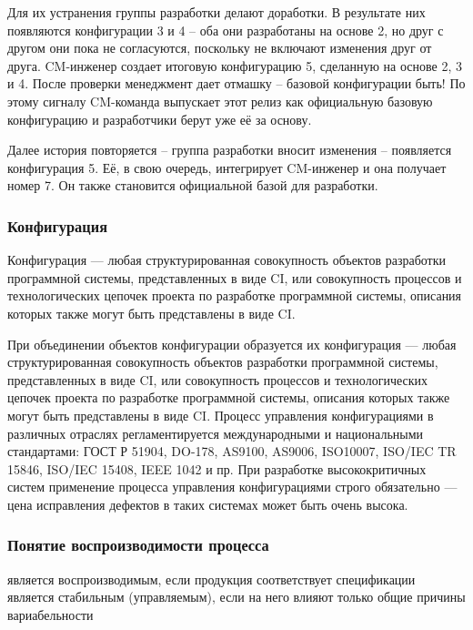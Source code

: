\documentclass{../industrial-development}
\begin{document}
Для их устранения группы разработки делают доработки. В результате них появляются конфигурации 3 и 4 – оба они разработаны на основе 2, но друг с другом они пока не согласуются, поскольку не включают изменения друг от друга. CM-инженер создает итоговую конфигурацию 5, сделанную на основе 2, 3 и 4. После проверки менеджмент дает отмашку – базовой конфигурации быть! По этому сигналу CM-команда выпускает этот релиз как официальную базовую конфигурацию и разработчики берут уже её за основу.

Далее история повторяется – группа разработки вносит изменения – появляется конфигурация 5. Её, в свою очередь, интегрирует CM-инженер и она получает номер 7. Он также становится официальной базой для разработки.
~\cite{Configurations}

\begin{frame} \frametitle{Конфигурация}
   \begin{block}{Конфигурация — любая структурированная совокупность объектов разработки программной системы, представленных в виде CI, или совокупность процессов и технологических цепочек проекта по разработке программной системы, описания которых также могут быть представлены в виде CI.}
  
 \end{block}
\end{frame}
	
	
	\lecturenotes
	При объединении объектов конфигурации образуется их конфигурация — любая структурированная совокупность объектов разработки программной системы, представленных в виде CI, или совокупность процессов и технологических цепочек проекта по разработке программной системы, описания которых также могут быть представлены в виде CI. Процесс управления конфигурациями в различных отраслях регламентируется международными и национальными стандартами: ГОСТ Р 51904, DO-178, AS9100, AS9006, ISO10007, ISO/IEC TR 15846, ISO/IEC 15408, IEEE 1042 и пр. При разработке высококритичных систем применение процесса управления конфигурациями строго обязательно — цена исправления дефектов в таких системах может быть очень высока.
~\cite{Standarts}

\begin{frame} \frametitle{Понятие воспроизводимости процесса}
  
  \begin{itemize}
 является воспроизводимым, если продукция соответствует спецификации
 является стабильным (управляемым), если на него влияют только общие причины вариабельности


  \end{itemize}
\end{frame}
\end{document}
